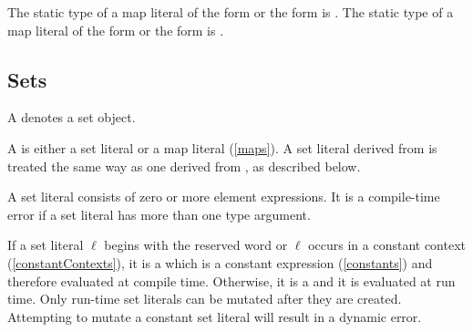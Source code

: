 \documentclass[makeidx]{article}
\begin{document}
{

\LMHash{}%
The static type of a map literal of the form
or the form
is
.
%
The static type of a map literal of the form
or the form
 is
.


\subsection{Sets}

\LMHash{}%
A  denotes a set object.

\begin{grammar}
<setLiteral> ::= \CONST{}? <typeArguments>?
  \gnewline{} `{' <expression> (`,' <expression>)* `,'? `\}'
\end{grammar}

\LMHash{}%
A  is either a set literal or a map literal
(\ref{maps}).
A set literal derived from 
is treated the same way as one derived from ,
as described below.

\LMHash{}%
A set literal consists of zero or more element expressions.
It is a compile-time error if a set literal has more than one type argument.


\LMHash{}%
If a set literal $\ell$ begins with the reserved word \CONST{}
or $\ell$ occurs in a constant context
(\ref{constantContexts}),
it is a
which is a constant expression
(\ref{constants})
and therefore evaluated at compile time.
Otherwise, it is a
and it is evaluated at run time.
Only run-time set literals can be mutated after they are created.
Attempting to mutate a constant set literal will result in a dynamic error.

}
\end{document}
